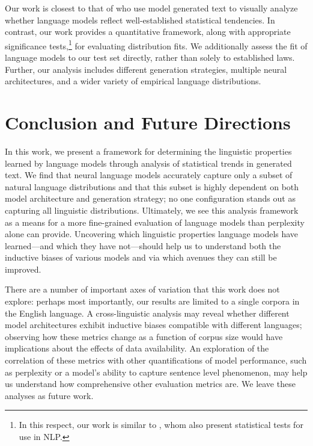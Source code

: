 \documentclass[11pt,a4paper]{article}
\newcommand{\note}[4][]{\todo[author=#2,color=#3,size=\scriptsize,fancyline,caption={},#1]{#4}} %
\newcommand{\clara}[2][]{\note[#1]{clara}{orange}{#2}}
\begin{document}
Our work is closest to that of \citet{takahashi_statistical,takahashi_evaluating} who use model generated text to visually analyze whether language models reflect well-established statistical tendencies. 
In contrast, our work provides a quantitative framework, along with appropriate significance tests,\footnote{In this respect, our work is similar to \citet{dror-etal-2018-hitchhikers}, whom also present statistical tests for use in NLP.} for evaluating distribution fits. 
We additionally assess the fit of language models to our test set directly, rather than solely to established laws. 
Further, our analysis includes different generation strategies, multiple neural architectures, and a wider variety of empirical language distributions.






\section{Conclusion and Future Directions}
In this work, we present a framework for determining the linguistic properties learned by language models through analysis of statistical trends in generated text. We find that neural language models accurately capture only a subset of natural language distributions and that this subset is highly dependent on both model architecture and generation strategy; no one configuration stands out as capturing all linguistic distributions. %
Ultimately, we see this analysis framework as a means for a more fine-grained evaluation of language models than perplexity alone can provide. Uncovering which linguistic properties language models have learned---and which they have not---should help us to understand both the inductive biases of various models and via which avenues they can still be improved.

There are a number of important axes of variation that this work does not explore: perhaps most importantly, our results are limited to a single corpora in the English language. A cross-linguistic analysis may reveal whether different model architectures exhibit inductive biases compatible with different languages; observing how these metrics change as a function of corpus size would have implications about the effects of data availability. An exploration of the correlation of these metrics with other quantifications of model performance, such as perplexity or a model’s ability to capture sentence level phenomenon, may help us understand how comprehensive other evaluation metrics are. We leave these analyses as future work.
\end{document}
